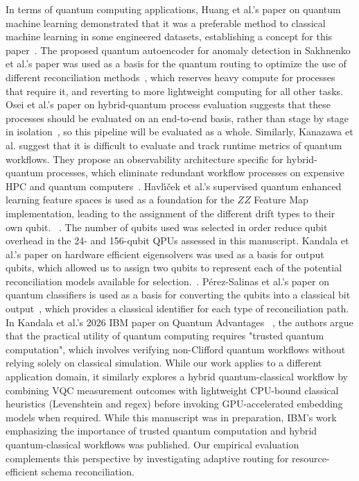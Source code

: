 \documentclass[journal]{IEEEtran}
\begin{document}
In terms of quantum computing applications, Huang et al.'s paper on quantum machine learning demonstrated that it was a preferable method to classical machine learning in some engineered datasets, establishing a concept for this paper~\cite{Huang_2021}. The proposed quantum autoencoder for anomaly detection in Sakhnenko et al.'s paper was used as a basis for the quantum routing to optimize the use of different reconciliation methods~\cite{Sakhnenko_2022}, which reserves heavy compute for processes that require it, and reverting to more lightweight computing for all other tasks. Osei et al.'s paper on hybrid-quantum process evaluation suggests that these processes should be evaluated on an end-to-end basis, rather than stage by stage in isolation~\cite{OseiHPE}, so this pipeline will be evaluated as a whole. Similarly, Kanazawa et al. suggest that it is difficult to evaluate and track runtime metrics of quantum workflows. They propose an observability architecture specific for hybrid-quantum processes, which eliminate redundant workflow processes on expensive HPC and quantum computers~\cite{KanazawaObservability}. Havl{\'\i}{\v{c}}ek et al.'s supervised quantum enhanced learning feature spaces is used as a foundation for the $ZZ$ Feature Map implementation, leading to the assignment of the different drift types to their own qubit. ~\cite{Havlicek_2019}. The number of qubits used was selected in order reduce qubit overhead in the 24- and 156-qubit QPUs assessed in this manuscript. Kandala et al.'s paper on hardware efficient eigensolvers was used as a basis for output qubits, which allowed us to assign two qubits to represent each of the potential reconciliation models available for selection.~\cite{Kandala_2017}. Pérez-Salinas et al.'s paper on quantum classifiers is used as a basis for converting the qubits into a classical bit output~\cite{P_rez_Salinas_2020}, which provides a classical identifier for each type of reconciliation path. In Kandala et al.'s 2026 IBM paper on Quantum Advantages ~\cite{Kandala2026QuantumAdvantage}, the authors argue that the practical utility of quantum computing requires "trusted quantum computation", which involves verifying non-Clifford quantum workflows without relying solely on classical simulation. While our work applies to a different application domain, it similarly explores a hybrid quantum-classical workflow by combining VQC measurement outcomes with lightweight CPU-bound classical heuristics (Levenshtein and regex) before invoking GPU-accelerated embedding models when required. While this manuscript was in preparation, IBM's work emphasizing the importance of trusted quantum computation and hybrid quantum-classical workflows was published. Our empirical evaluation complements this perspective by investigating adaptive routing for resource-efficient schema reconciliation.
\end{document}
